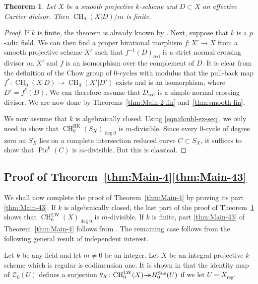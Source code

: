 \documentclass[JEP,XML,SOM,Unicode,published]{cedram}
\let\mathcal\mathscr
\newcommand{\onto}{\mathchoice{\to\hspace*{-5mm}\to}{\hspace*{-.5mm}\to\hspace*{-2.85mm}\to\hspace*{-.5mm}}{\to\hspace*{-3mm}\to}{\to\hspace*{-3mm}\to}}
\let\surj\onto
\newcommand{\BK}{\mathrm{BK}}
\newcommand{\LW}{\mathrm{LW}}
\newcommand{\sus}{\mathrm{Sus}}
\newtheorem{thm}{Theorem}[section]
\theoremstyle{definition}
\newcommand{\thmref}{Theorem~\ref}
\newcommand{\sZ}{{\mathcal Z}}
\DeclareMathOperator{\CH}{CH}
\DeclareMathOperator{\Pic}{Pic}
\newcommand{\red}{\mathrm{red}}
\newcommand{\reg}{\mathrm{reg}}
\begin{document}
\begin{thm}\label{thm:Mod-fin}
Let $X$ be a smooth projective $k$-scheme and $D \subset X$ an effective Cartier
divisor. Then ${\CH_0(X|D)}/m$ is finite.
\end{thm}
\begin{proof}
If $k$ is finite, the theorem is already known by \cite[Th.\,1.3 \& 4.8]{GKris}.
Next, suppose that $k$ is a $p$-adic field. We can then
find a proper birational morphism $f \colon X' \to X$ from a smooth
projective scheme $X'$ such that $f^{-1}(D)_\red$ is a strict normal
crossing divisor on $X'$ and $f$ is an isomorphism over the complement of
$D$. It is clear from the definition of the Chow group of $0$-cycles
with modulus that the pull-back map $f^* \colon \CH_0(X|D) \to
\CH_0(X'|D')$ exists and is an isomorphism, where $D' = f^*(D)$.
We can therefore assume that $D_\red$ is a simple normal crossing
divisor. We are now done by Theorems~\ref{thm:Main-2-fin} and~\ref{thm:smooth-fin}.

We now assume that $k$ is algebraically closed. Using \eqref{eqn:doubl-ex-seq},
we only need to show that $\CH^{\BK}_0(S_X)_{\deg 0}$ is
$m$-divisible. Since every $0$-cycle of degree zero on $S_X$ lies on
a complete intersection reduced curve $C \subset S_X$, it suffices to
show that $\Pic^0(C)$ is $m$-divisible. But this is classical.
\end{proof}

\subsection{Proof of \thmref{thm:Main-4}\eqref{thm:Main-43}}\label{sec:FLW}
We shall now complete the proof of \thmref{thm:Main-4} by proving its part \eqref{thm:Main-43}.
If $k$ is algebraically closed, the last part of the proof of \thmref{thm:Mod-fin}
shows that $\CH^{\LW}_0(X)_{\deg 0}$ is $m$-divisible. If $k$ is finite,
part \eqref{thm:Main-43} of \thmref{thm:Main-4} follows from \cite[Th.\,1.3]{GK-1}.
The remaining case follows from the following general result of independent
interest.

Let $k$ be any field and let $m\!\neq\!0$ be an integer.
Let $X$ be an integral \hbox{projective} $k$-scheme which is regular is codimension one.
It is shown in \cite[Lem.\,8.3]{GK-1} that the identity map of
$\sZ_0(U)$ defines a surjection
$\theta_X \colon\!\CH^{\LW}_0(X) \!\surj\! H^{\sus}_0(U)$ if we let \hbox{$U\!=\!X_\reg$}.
\end{document}
